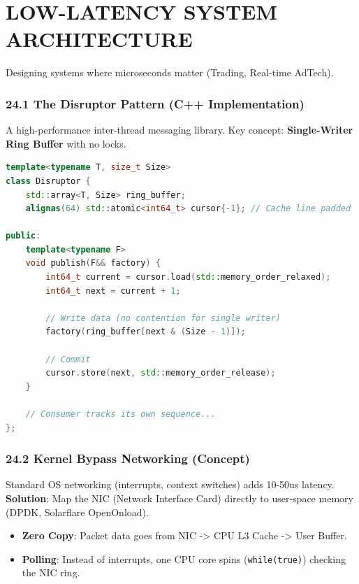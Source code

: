 \hypertarget{low-latency-system-architecture}{%
\chapter{LOW-LATENCY SYSTEM
ARCHITECTURE}\label{low-latency-system-architecture}}

Designing systems where microseconds matter (Trading, Real-time AdTech).

\hypertarget{the-disruptor-pattern-c-implementation}{%
\subsection{24.1 The Disruptor Pattern (C++
Implementation)}\label{the-disruptor-pattern-c-implementation}}

A high-performance inter-thread messaging library. Key concept:
\textbf{Single-Writer Ring Buffer} with no locks.

\begin{lstlisting}[language={C++}]
template<typename T, size_t Size>
class Disruptor {
    std::array<T, Size> ring_buffer;
    alignas(64) std::atomic<int64_t> cursor{-1}; // Cache line padded
    
public:
    template<typename F>
    void publish(F&& factory) {
        int64_t current = cursor.load(std::memory_order_relaxed);
        int64_t next = current + 1;
        
        // Write data (no contention for single writer)
        factory(ring_buffer[next & (Size - 1)]);
        
        // Commit
        cursor.store(next, std::memory_order_release);
    }
    
    // Consumer tracks its own sequence...
};
\end{lstlisting}

\hypertarget{kernel-bypass-networking-concept}{%
\subsection{24.2 Kernel Bypass Networking
(Concept)}\label{kernel-bypass-networking-concept}}

Standard OS networking (interrupts, context switches) adds 10-50us
latency. \textbf{Solution}: Map the NIC (Network Interface Card)
directly to user-space memory (DPDK, Solarflare OpenOnload).

\begin{itemize}
\tightlist
\item
  \textbf{Zero Copy}: Packet data goes from NIC -\textgreater{} CPU L3
  Cache -\textgreater{} User Buffer.
\item
  \textbf{Polling}: Instead of interrupts, one CPU core spins
  (\passthrough{\lstinline!while(true)!}) checking the NIC ring.
\end{itemize}


